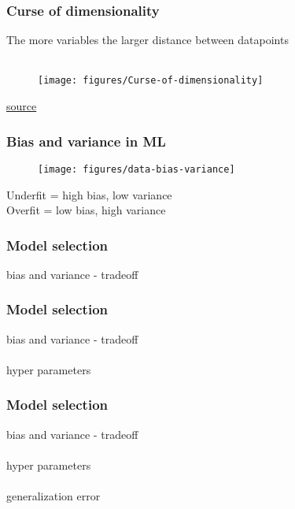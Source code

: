 \documentclass{beamer}
\begin{document}
\begin{frame}
	\frametitle{Curse of dimensionality}
	\begin{center}
		The more variables the larger distance between datapoints\\~\\
		\begin{figure}
			\texttt{[image: figures/Curse-of-dimensionality]}
			\label{fig:dim-curse}
		\end{figure}
		\href{http://www.newsnshit.com/curse-of-dimensionality-interactive-demo/}
		{source}
	\end{center}
\end{frame}

\begin{frame}
	\frametitle{Bias and variance in ML}
	\begin{center}
		\begin{figure}
			\texttt{[image: figures/data-bias-variance]}
			\label{fig:bias-var}
		\end{figure}
		\medskip
		Underfit = high bias, low variance\\
		Overfit = low bias, high variance
	\end{center}
\end{frame}

\begin{frame}
	\frametitle{Model selection}
	\begin{center}
		bias and variance - tradeoff\\
	\end{center}
\end{frame}

\begin{frame}
	\frametitle{Model selection}
	\begin{center}
		bias and variance - tradeoff\\~\\
		hyper parameters
	\end{center}
\end{frame}

\begin{frame}
	\frametitle{Model selection}
	\begin{center}
		bias and variance - tradeoff\\~\\
		hyper parameters\\~\\
		generalization error
	\end{center}
\end{frame}
\end{document}
